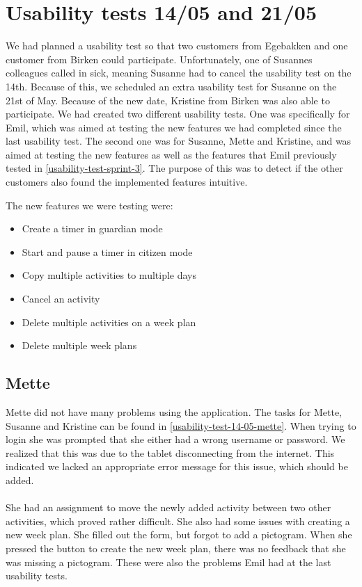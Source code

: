 \section{Usability tests 14/05 and 21/05}\label{usability-test-14-05}
We had planned a usability test so that two customers from Egebakken and one customer from Birken could participate.
Unfortunately, one of Susannes colleagues called in sick, meaning Susanne had to cancel the usability test on the 14th.
Because of this, we scheduled an extra usability test for Susanne on the 21st of May. 
Because of the new date, Kristine from Birken was also able to participate. 
We had created two different usability tests. 
One was specifically for Emil, which was aimed at testing the new features we had completed since the last usability test.
The second one was for Susanne, Mette and Kristine, and was aimed at testing the new features as well as the features that Emil previously tested in \autoref{usability-test-sprint-3}. 
The purpose of this was to detect if the other customers also found the implemented features intuitive.

The new features we were testing were:

\begin{itemize}
  \item Create a timer in guardian mode
  \item Start and pause a timer in citizen mode
  \item Copy multiple activities to multiple days
  \item Cancel an activity
  \item Delete multiple activities on a week plan
  \item Delete multiple week plans
\end{itemize}


\subsection{Mette}
Mette did not have many problems using the application.
The tasks for Mette, Susanne and Kristine can be found in \autoref{usability-test-14-05-mette}.
When trying to login she was prompted that she either had a wrong username or password. 
We realized that this was due to the tablet disconnecting from the internet.
This indicated we lacked an appropriate error message for this issue, which should be added.
\\\\
She had an assignment to move the newly added activity between two other activities, which proved rather difficult. 
She also had some issues with creating a new week plan.
She filled out the form, but forgot to add a pictogram. 
When she pressed the button to create the new week plan, there was no feedback that she was missing a pictogram.
These were also the problems Emil had at the last usability tests.

